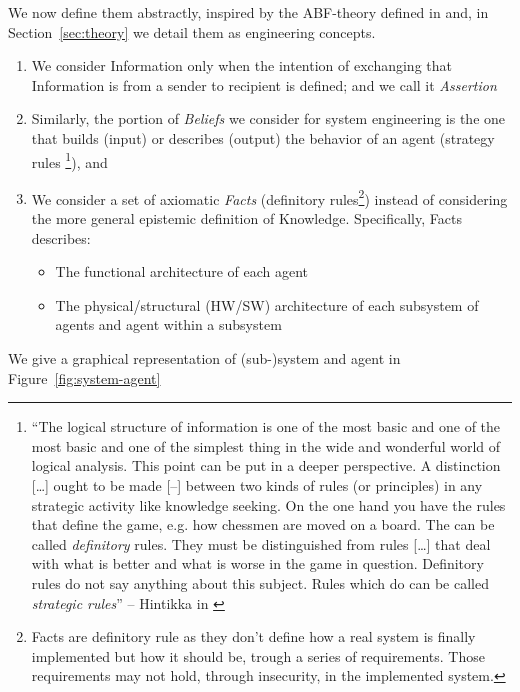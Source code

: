 \documentclass[conference]{IEEEtran}
\begin{document}
We now define them abstractly, inspired by the
ABF-theory  defined in \autocite{Santaca2016abf} and, in
Section~\ref{sec:theory} we detail them as engineering concepts.
\begin{enumerate}
	\item We consider Information only when the intention of exchanging 
		that Information is from a sender to 
		recipient is defined; and we call it \emph{Assertion}  
	\item Similarly, the portion of \emph{Beliefs} we consider for system
		engineering is the one that builds (input) or describes
		(output) the behavior of an agent (strategy rules
		\footnote{``The logical structure of information is one of the
		most basic and one of the most basic and one of the simplest
		thing in the wide and wonderful world of logical analysis. This
		point can be put in a deeper perspective. A distinction
		[\ldots] ought to be made [--] between two kinds of rules (or
		principles) in any strategic activity like knowledge seeking.
		On the one hand you have the rules that define the game, e.g.
		how chessmen are moved on a board. The can be called
		\emph{definitory} rules.  They must be distinguished from rules
		[\ldots] that deal with what is better and what is worse in the
		game in question.  Definitory rules do not say anything about
		this subject. Rules which do can be called \emph{strategic
		rules}'' -- Hintikka in \autocite{Hintikka1993Information}}),
		and
	\item We consider a set of axiomatic \emph{Facts} (definitory
		rules\footnote{Facts are definitory rule as they don't
		define how a real system is finally implemented but
		how it should be, trough a series of requirements. Those requirements 
		may not hold, through insecurity, in the implemented system.})
		instead of considering the more general epistemic definition of
		Knowledge. Specifically, Facts describes:
		\begin{itemize}
			\item The functional architecture of each agent
			\item The physical/structural (HW/SW) architecture of each
				subsystem of agents and agent within a
				subsystem
		\end{itemize}
\end{enumerate}
We give a graphical representation of (sub-)system and agent in Figure~\ref{fig:system-agent}
\end{document}
